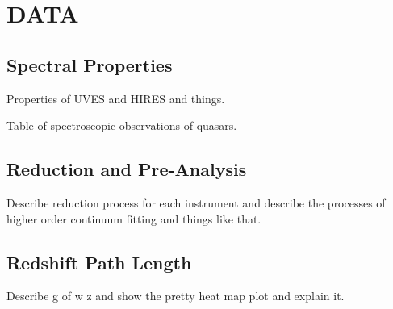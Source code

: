 \label{ch2}
\section{\MakeUppercase{Data}}

\subsection{Spectral Properties}
\label{ch2:spectra}

Properties of UVES and HIRES and things.

Table of spectroscopic observations of quasars.

\subsection{Reduction and Pre-Analysis}
\label{ch2:reduction}

Describe reduction process for each instrument and describe the processes of higher order continuum fitting and things like that.

\subsection{Redshift Path Length}
\label{ch2:pathlength}

Describe g of w z and show the pretty heat map plot and explain it.
